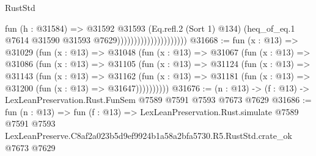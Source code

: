\begin{lexlean}{RustStd}
\begin{coremodule}
                                          fun (h : @31584) =>
                                          @31592
                                            @31593
                                            (Eq.refl.{2} (Sort 1) @134)
                                            (heq_of_eq.{1}
                                              @7614
                                              @31590
                                              @31593
                                              @7629)))))))))))))))))))))
@31668 := fun (x : @13) =>
  @31029
    (fun (x : @13) =>
    @31048
      (fun (x : @13) =>
      @31067
        (fun (x : @13) =>
        @31086
          (fun (x : @13) =>
          @31105
            (fun (x : @13) =>
            @31124
              (fun (x : @13) =>
              @31143
                (fun (x : @13) =>
                @31162
                  (fun (x : @13) =>
                  @31181 (fun (x : @13) => @31200 (fun (x : @13) => @31647))))))))))
@31676 := (n : @13) -> (f : @13) -> LexLeanPreservation.Rust.FunSem @7589 @7591 @7593 @7673 @7629
@31686 := fun (n : @13) =>
  fun (f : @13) =>
  LexLeanPreservation.Rust.simulate
    @7589
    @7591
    @7593
    LexLeanPreserve.C8af2a023b5d9ef9924b1a58a2bfa5730.R5.RustStd.crate_ok
    @7673
    @7629
\end{coremodule}
\end{lexlean}
